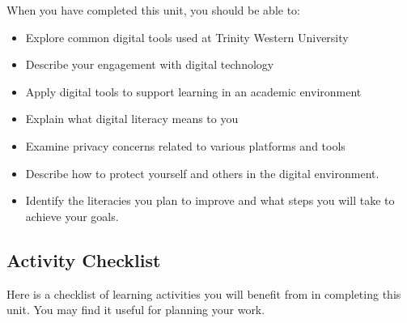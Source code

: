 \documentclass[
]{book}
\providecommand{\tightlist}{%
  \setlength{\itemsep}{0pt}\setlength{\parskip}{0pt}}
\theoremstyle{definition}
\theoremstyle{definition}
\theoremstyle{definition}
\theoremstyle{definition}
\theoremstyle{remark}
\begin{document}
When you have completed this unit, you should be able to:

\begin{itemize}
\tightlist
\item
  Explore common digital tools used at Trinity Western University
\item
  Describe your engagement with digital technology\\
\item
  Apply digital tools to support learning in an academic environment\\
\item
  Explain what digital literacy means to you\\
\item
  Examine privacy concerns related to various platforms and tools\\
\item
  Describe how to protect yourself and others in the digital environment.\\
\item
  Identify the literacies you plan to improve and what steps you will take to achieve your goals.
\end{itemize}

\hypertarget{activity-checklist}{%
\subsection*{Activity Checklist}\label{activity-checklist}}

Here is a checklist of learning activities you will benefit from in completing this unit. You may find it useful for planning your work.
\end{document}

